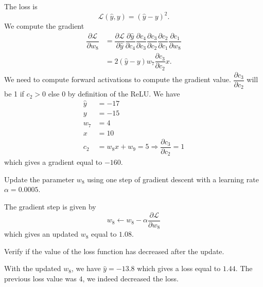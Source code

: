 \documentclass[11pt, a4paper]{exam}
\begin{document}
\begin{exercises}
\begin{parts}
\begin{subparts}
        \begin{solution}
            The loss is
            \[
                \mathcal{L}(\hat{y}, y) = (\hat{y} - y)^2.
            \]
            We compute the gradient
            \begin{align*}
                \dfrac{\partial \mathcal{L}}{\partial w_8} &= \dfrac{\partial \mathcal{L}}{\partial \hat{y}}\dfrac{\partial \hat{y}}{\partial c_4}\dfrac{\partial c_4}{\partial c_3}\dfrac{\partial c_3}{\partial c_2}\dfrac{\partial c_2}{\partial c_1}\dfrac{\partial c_1}{\partial w_8} \\
                &= 2(\hat{y} - y)w_7\dfrac{\partial c_3}{\partial c_2}x.
            \end{align*}
            We need to compute forward activations to compute the gradient value. $\dfrac{\partial c_3}{\partial c_2}$ will be 1 if $c_2 > 0$ else $0$ by definition of the ReLU. We have
            \begin{align*}
                \hat{y} &= -17 \\
                y &= -15 \\
                w_7 &= 4 \\
                x &= 10 \\
                c_2 &= w_8x + w_9 = 5 \Rightarrow \dfrac{\partial c_3}{\partial c_2} = 1
            \end{align*}
            which gives a gradient equal to $-160$.
        \end{solution}

        \subpart Update the parameter $w_8$ using one step of gradient descent with a learning rate $\alpha = 0.0005$.

        \begin{solution}
            The gradient step is given by
            \[
                w_8 \leftarrow w_8 - \alpha \dfrac{\partial \mathcal{L}}{\partial w_8}
            \]
            which gives an updated $w_8$ equal to $1.08$.
        \end{solution}

        \subpart Verify if the value of the loss function has decreased after the update.

        \begin{solution}
            With the updated $w_8$, we have $\hat{y} = -13.8$ which gives a loss equal to $1.44$. The previous loss value was $4$, we indeed decreased the loss.
        \end{solution}
    \end{subparts}
\end{parts}


\end{exercises}
\end{document}
